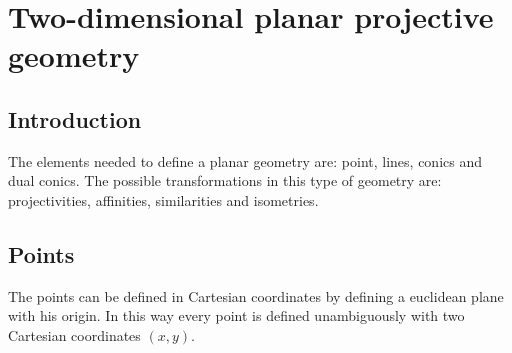 \documentclass[12pt, a4paper]{report}
\begin{document}
\newpage

\chapter{Two-dimensional planar projective geometry}
    \section{Introduction}
    The elements needed to define a planar geometry are: point, lines, conics and dual conics. The possible transformations in this type of geometry are: projectivities, 
    affinities, similarities and isometries. 

    \section{Points}
    The points can be defined in Cartesian coordinates by defining a euclidean plane with his origin. In this way every point is defined unambiguously with two Cartesian 
    coordinates $(x,y)$. 
\end{document}
